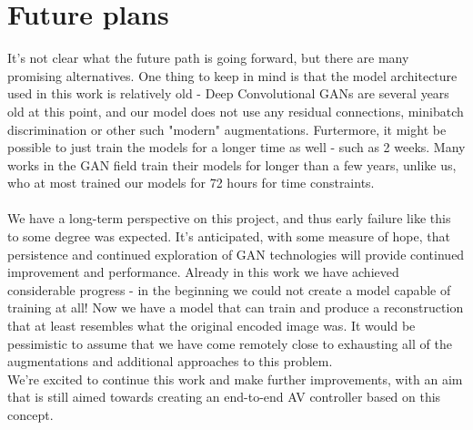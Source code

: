 \documentclass{article}
\begin{document}
\section{Future plans}
It's not clear what the future path is going forward, but there are many promising alternatives. One thing to keep in mind is that the model architecture used in this work is relatively old - Deep Convolutional GANs are several years old at this point, and our model does not use any residual connections, minibatch discrimination or other such "modern" augmentations. Furtermore, it might be possible to just train the models for a longer time as well - such as 2 weeks. Many works in the GAN field train their models for longer than a few years, unlike us, who at most trained our models for 72 hours for time constraints. \\ \\
We have a long-term perspective on this project, and thus early failure like this to some degree was expected. It's anticipated, with some measure of hope, that persistence and continued exploration of GAN technologies will provide continued improvement and performance. Already in this work we have achieved considerable progress - in the beginning we could not create a model capable of training at all! Now we have a model that can train and produce a reconstruction that at least resembles what the original encoded image was. It would be pessimistic to assume that we have come remotely close to exhausting all of the augmentations and additional approaches to this problem. \\

We're excited to continue this work and make further improvements, with an aim that is still aimed towards creating an end-to-end AV controller based on this concept.


\end{document}
